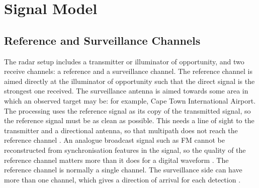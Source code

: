 \section{Signal Model}
\label{sec:th.signalmodel}
\todo{}

\subsection{Reference and Surveillance Channels}
\label{subsec:th.signalmodel.channels}
\todo{}
The radar setup includes a transmitter or illuminator of opportunity, and two receive channels: a reference and a surveillance channel. The reference channel is aimed directly at the illuminator of opportunity such that the direct signal is the strongest one received. The surveillance antenna is aimed towards some area in which an observed target may be: for example, Cape Town International Airport. The processing uses the reference signal as its copy of the transmitted signal, so the reference signal must be as clean as possible. This needs a line of sight to the transmitter and a directional antenna, so that multipath does not reach the reference channel \citep{kuschel2019}. An analogue broadcast signal such as FM cannot be reconstructed from synchronisation features in the signal, so the quality of the reference channel matters more than it does for a digital waveform \citep{kuschel2019}. The reference channel is normally a single channel. The surveillance side can have more than one channel, which gives a direction of arrival for each detection \citep{kuschel2019,colone2023}.

